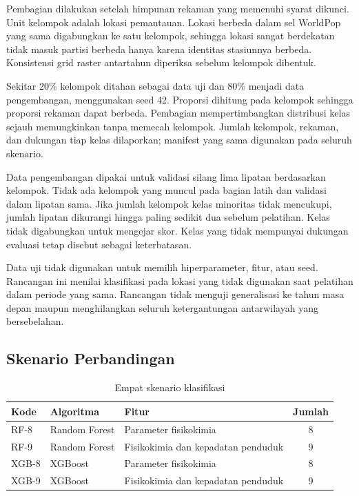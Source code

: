 Pembagian dilakukan setelah himpunan rekaman yang memenuhi syarat dikunci. Unit kelompok adalah lokasi pemantauan. Lokasi berbeda dalam sel WorldPop yang sama digabungkan ke satu kelompok, sehingga lokasi sangat berdekatan tidak masuk partisi berbeda hanya karena identitas stasiunnya berbeda. Konsistensi grid raster antartahun diperiksa sebelum kelompok dibentuk.

Sekitar 20\% kelompok ditahan sebagai data uji dan 80\% menjadi data pengembangan, menggunakan seed 42. Proporsi dihitung pada kelompok sehingga proporsi rekaman dapat berbeda. Pembagian mempertimbangkan distribusi kelas sejauh memungkinkan tanpa memecah kelompok. Jumlah kelompok, rekaman, dan dukungan tiap kelas dilaporkan; manifest yang sama digunakan pada seluruh skenario.

Data pengembangan dipakai untuk validasi silang lima lipatan berdasarkan kelompok. Tidak ada kelompok yang muncul pada bagian latih dan validasi dalam lipatan sama. Jika jumlah kelompok kelas minoritas tidak mencukupi, jumlah lipatan dikurangi hingga paling sedikit dua sebelum pelatihan. Kelas tidak digabungkan untuk mengejar skor. Kelas yang tidak mempunyai dukungan evaluasi tetap disebut sebagai keterbatasan.

Data uji tidak digunakan untuk memilih hiperparameter, fitur, atau seed. Rancangan ini menilai klasifikasi pada lokasi yang tidak digunakan saat pelatihan dalam periode yang sama. Rancangan tidak menguji generalisasi ke tahun masa depan maupun menghilangkan seluruh ketergantungan antarwilayah yang bersebelahan.

\subsection{Skenario Perbandingan}

\begin{table}[H]
    \centering
    \caption{Empat skenario klasifikasi}
    \label{tab:bab3-skenario}
    \small
    \renewcommand{\arraystretch}{1.2}
    \begin{tabularx}{\linewidth}{@{}p{1.5cm}p{2.9cm}>{\raggedright\arraybackslash}Xc@{}}
        \toprule
        Kode & Algoritma & Fitur & Jumlah \\
        \midrule
        RF-8 & Random Forest & Parameter fisikokimia & 8 \\
        RF-9 & Random Forest & Fisikokimia dan kepadatan penduduk & 9 \\
        XGB-8 & XGBoost & Parameter fisikokimia & 8 \\
        XGB-9 & XGBoost & Fisikokimia dan kepadatan penduduk & 9 \\
        \bottomrule
    \end{tabularx}
\end{table}

